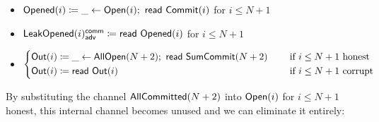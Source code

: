 \begin{itemize}
\item {\color{red} $\mathsf{Opened}(i) \coloneqq \_ \leftarrow \mathsf{Open}(i); \ \mathsf{read} \ \mathsf{Commit}(i)$ for $i \leq N+1$}
\item {\color{red} $\mathsf{LeakOpened}(i)^{\mathsf{comm}}_{\mathsf{adv}} \coloneqq \mathsf{read} \ \mathsf{Opened}(i)$ for $i \leq N+1$}
\item $\begin{cases*} \Out(i) \coloneqq \_ \leftarrow \AllOpen(N+2); \ \read{\SumCommit(N+2)} & \hspace{10pt} \text{if $i \leq N+1$ honest} \\ \Out(i) \coloneqq \read{\Out(i)} & \hspace{10pt} \text{if $i \leq N+1$ corrupt} \end{cases*}$
\end{itemize}

\noindent By substituting the channel $\mathsf{AllCommitted}(N+2)$ into $\mathsf{Open}(i)$ for $i \leq N+1$ honest, this internal channel becomes unused and we can eliminate it entirely:

